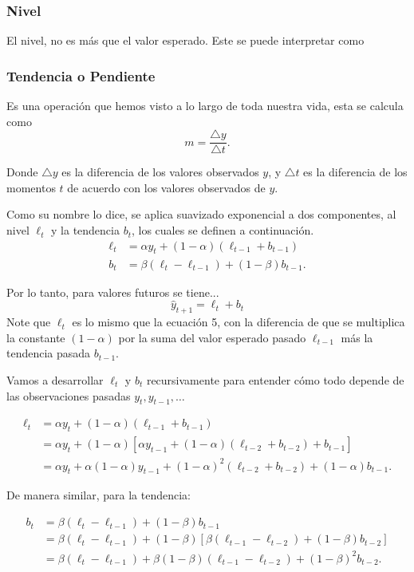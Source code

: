 \documentclass[12pt,letterpaper]{article}
\begin{document}
\subsubsection{Nivel}
El nivel, no es más que el valor esperado. Este se puede interpretar como 

\subsubsection{Tendencia o Pendiente}
Es una operación que hemos visto a lo largo de toda nuestra vida, esta se calcula como 
\begin{equation}
    m = \frac{\triangle y}{\triangle t}.
\end{equation}

Donde $\triangle y$ es la diferencia de los valores observados $y$, y $\triangle t$ es la diferencia de los momentos $t$ de acuerdo con los valores observados de $y$.

Como su nombre lo dice, se aplica suavizado exponencial a dos componentes, al nivel \(\ell_t\) y la tendencia \(b_t\), los cuales se definen a continuación.
\begin{align}
    \ell_t &= \alpha y_t + (1 - \alpha)(\ell_{t-1} + b_{t-1}) \\
    b_t &= \beta(\ell_t - \ell_{t-1}) + (1 - \beta) b_{t-1}.
\end{align}

Por lo tanto, para valores futuros se tiene...
\[
\hat{y}_{t+1} = \ell_t + b_t
\]
Note que $\ell_t$ es lo mismo que la ecuación 5, con la diferencia de que se multiplica la constante $(1-\alpha)$ por la suma del valor esperado  pasado $\ell_{t-1}$ más la tendencia pasada $b_{t-1}$. 

Vamos a desarrollar \(\ell_t\) y \(b_t\) recursivamente para entender cómo todo depende de las observaciones pasadas \(y_t, y_{t-1}, \dots\)

\begin{align}
    \ell_t &= \alpha y_t + (1 - \alpha)(\ell_{t-1} + b_{t-1}) \\
           &= \alpha y_t + (1 - \alpha)\left[ \alpha y_{t-1} + (1 - \alpha)(\ell_{t-2} + b_{t-2}) + b_{t-1} \right] \\
           &= \alpha y_t + \alpha(1 - \alpha) y_{t-1} + (1 - \alpha)^2 (\ell_{t-2} + b_{t-2}) + (1 - \alpha) b_{t-1}.
\end{align}

De manera similar, para la tendencia:

\begin{align}
    b_t &= \beta(\ell_t - \ell_{t-1}) + (1 - \beta) b_{t-1} \\
        &= \beta(\ell_t - \ell_{t-1}) + (1 - \beta)\left[ \beta(\ell_{t-1} - \ell_{t-2}) + (1 - \beta) b_{t-2} \right] \\
        &= \beta(\ell_t - \ell_{t-1}) + \beta(1 - \beta)(\ell_{t-1} - \ell_{t-2}) + (1 - \beta)^2 b_{t-2}.
\end{align}
\end{document}
